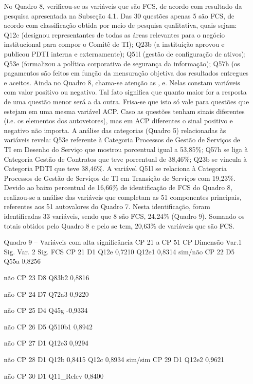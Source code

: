 No Quadro 8, verificou-se as variáveis que são FCS, de acordo com resultado da pesquisa apresentada na Subseção 4.1. Das 30 questões apenas 5 são FCS, de acordo com classificação obtida por meio de pesquisa qualitativa, quais sejam: Q12c (designou representantes de todas as áreas relevantes para o negócio institucional para compor o Comitê de TI); Q23b (a instituição aprovou e  publicou PDTI interna e externamente); Q51l (gestão de configuração de ativos); Q53e (formalizou a política corporativa de segurança da informação); Q57h (os pagamentos são feitos em função da mensuração objetiva dos resultados entregues e aceitos.
Ainda no Quadro 8, chama-se atenção as ,  e. Nelas constam variáveis com valor positivo ou negativo. Tal fato significa que quanto maior for a resposta de uma questão menor será a da outra. Frisa-se que isto só vale para questões que estejam em uma mesma variável ACP. Caso as questões tenham sinais diferentes (i.e. os elementos dos autovetores), mas em ACP diferentes o sinal positivo e negativo não importa. 
A análise das categorias (Quadro 5) relacionadas às variáveis revela: Q53e referente à Categoria Processos de Gestão de Serviços de TI em Desenho do Serviço que mostrou porcentual igual a 53,85\%; Q57h se liga à Categoria Gestão de Contratos que teve porcentual de 38,46\%; Q23b se vincula à Categoria PDTI que teve 38,46\%. A variável Q51l se relaciona à Categoria Processos de Gestão de Serviços de TI em Transição de Serviços com 19,23\%.
Devido ao baixo percentual de 16,66\% de identificação de FCS do Quadro 8, realizou-se a análise das variáveis que completam as 51 componentes principais, referentes aos 51 autovalores do Quadro 7. Nesta identificação, foram identificadas 33 variáveis, sendo que 8 são FCS, 24,24\% (Quadro 9). Somando os totais obtidos pelo Quadro 8 e pelo se tem, 20,63\% de variáveis que são FCS.

Quadro 9 – Variáveis com alta significância CP 21 a CP 51
CP
Dimensão
Var.1
Sig.
Var. 2
Sig.
FCS
CP 21
D1
Q12e 
0,7210
 Q12e1 
0,8314
sim/não
CP 22
D5
 Q55a
0,8256
 

não
CP 23
D8
 Q83b2
0,8816
 

não
CP 24
D7
Q72a3 
0,9220
 

não
CP 25
D4
 Q45g
-0,9334


não
CP 26
D5
Q510b1
0,8942


não
CP 27
D1
Q12e3 
0,9294
 

não
CP 28
D1
Q12b 
0,8415
 Q12c
0,8934
sim/sim
CP 29
D1
 Q12e2
0,9621
 

não
CP 30
D1
 Q11_Relev
0,8400
 


